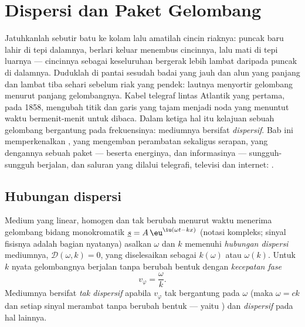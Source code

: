 \chapter{Dispersi dan Paket Gelombang}\label{ch:b2:dispersion-wave-packets}

Jatuhkanlah sebutir batu ke kolam lalu amatilah cincin riaknya: puncak
baru lahir di tepi dalamnya, berlari keluar menembus cincinnya, lalu mati
di tepi luarnya --- cincinnya sebagai keseluruhan bergerak lebih lambat
daripada puncak di dalamnya. Duduklah di pantai sesudah badai yang jauh
dan alun yang panjang dan lambat tiba sehari sebelum riak yang pendek: lautnya
menyortir gelombang menurut panjang gelombangnya. Kabel telegraf lintas
Atlantik yang pertama, pada 1858, mengubah titik dan garis yang tajam
menjadi noda yang menuntut waktu bermenit-menit untuk dibaca. Dalam ketiga hal itu
kelajuan sebuah gelombang bergantung pada frekuensinya: mediumnya bersifat
\emph{dispersif}. Bab ini memperkenalkan ,
 yang mengemban perambatan sekaligus serapan,
 yang dengannya sebuah paket --- beserta energinya, dan
informasinya --- sungguh-sungguh berjalan, dan saluran yang dilalui telegrafi,
televisi dan internet: .

\section{Hubungan dispersi}

\begin{definition}\label{def:b2:dispersion-wave-packets:relation}
Medium yang linear, homogen dan tak berubah menurut waktu menerima gelombang
bidang monokromatik $\underline s = A\,\eu^{\iu(\omega t - kx)}$ (notasi
kompleks; sinyal fisisnya adalah bagian nyatanya) asalkan $\omega$ dan $k$
memenuhi \emph{hubungan dispersi} mediumnya, $\mathcal D(\omega, k)
= 0$, yang diselesaikan sebagai $k(\omega)$ atau $\omega(k)$. Untuk $k$ nyata gelombangnya berjalan
tanpa berubah bentuk dengan \emph{kecepatan fase}
\[
v_\varphi = \frac\omega k .
\]
Mediumnya bersifat \emph{tak dispersif} apabila $v_\varphi$ tak bergantung pada
$\omega$ (maka $\omega = ck$ dan setiap sinyal merambat tanpa berubah bentuk --- yaitu
) dan \emph{dispersif} pada hal lainnya.
\end{definition}

